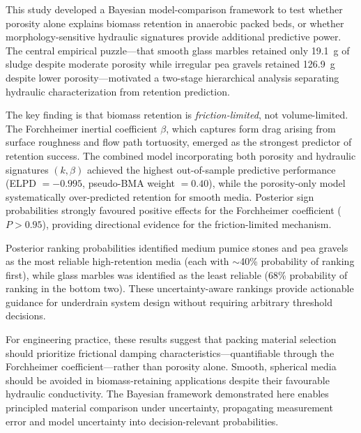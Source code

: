\documentclass[12pt,a4paper]{article}
\begin{document}
This study developed a Bayesian model-comparison framework to test whether porosity alone explains biomass retention in anaerobic packed beds, or whether morphology-sensitive hydraulic signatures provide additional predictive power. The central empirical puzzle---that smooth glass marbles retained only 19.1~g of sludge despite moderate porosity while irregular pea gravels retained 126.9~g despite lower porosity---motivated a two-stage hierarchical analysis separating hydraulic characterization from retention prediction.

The key finding is that biomass retention is \emph{friction-limited}, not volume-limited. The Forchheimer inertial coefficient $\beta$, which captures form drag arising from surface roughness and flow path tortuosity, emerged as the strongest predictor of retention success. The combined model incorporating both porosity and hydraulic signatures $(k, \beta)$ achieved the highest out-of-sample predictive performance (ELPD $= -0.995$, pseudo-BMA weight $= 0.40$), while the porosity-only model systematically over-predicted retention for smooth media. Posterior sign probabilities strongly favoured positive effects for the Forchheimer coefficient ($P > 0.95$), providing directional evidence for the friction-limited mechanism.

Posterior ranking probabilities identified medium pumice stones and pea gravels as the most reliable high-retention media (each with $\sim$40\% probability of ranking first), while glass marbles was identified as the least reliable (68\% probability of ranking in the bottom two). These uncertainty-aware rankings provide actionable guidance for underdrain system design without requiring arbitrary threshold decisions.

For engineering practice, these results suggest that packing material selection should prioritize frictional damping characteristics---quantifiable through the Forchheimer coefficient---rather than porosity alone. Smooth, spherical media should be avoided in biomass-retaining applications despite their favourable hydraulic conductivity. The Bayesian framework demonstrated here enables principled material comparison under uncertainty, propagating measurement error and model uncertainty into decision-relevant probabilities.



\end{document}
